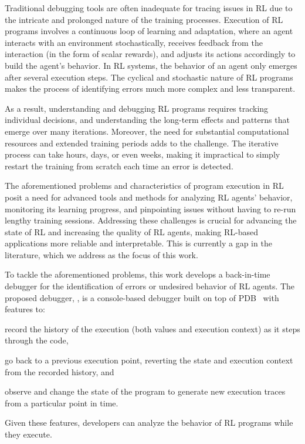 Traditional debugging tools are often inadequate for tracing issues in \ac{RL} due to the intricate 
and prolonged nature of the training processes. Execution of \ac{RL} programs involves a 
continuous loop of learning and adaptation, where an agent 
interacts with an environment stochastically, receives feedback from the interaction (in the form of 
scalar rewards), and adjusts its actions accordingly to build the agent's behavior. In \ac{RL} systems, 
the behavior of an agent only emerges after several execution steps. The cyclical and stochastic 
nature of \ac{RL} programs makes the process of identifying errors much more complex and less 
transparent.

As a result, understanding and debugging \ac{RL} programs requires tracking individual 
decisions, and understanding the long-term effects and patterns that emerge over many iterations.
Moreover, the need for substantial computational resources and extended training 
periods adds to the challenge. The iterative process can take hours, days, or 
even weeks, making it impractical to simply restart the training from scratch 
each time an error is detected.

The aforementioned problems and characteristics of program execution in \ac{RL} posit a need 
for advanced tools and methods for analyzing \ac{RL} agents' behavior, monitoring its learning 
progress, and pinpointing issues without having to re-run lengthy training sessions.
Addressing these challenges is crucial for advancing the state of \ac{RL} and increasing the quality 
of \ac{RL} agents, making \ac{RL}-based applications more reliable and interpretable. This is 
currently a gap in the literature, which we address as the focus of this work.

To tackle the aforementioned problems, this work develops a back-in-time 
debugger for the identification of errors or undesired behavior of \ac{RL} agents. The proposed 
debugger, \flik, is a console-based debugger built on top of PDB~\cite{python-pdb} with features to: 
\begin{enumerate*}[label=(\arabic*)]
\item record the history of the execution (both values and execution context) as it steps through the 
code,
\item go back to a previous execution point, reverting the state and execution context from the 
recorded history, and 
\item observe and change the state of the program to generate new execution traces from a particular 
point in time.
\end{enumerate*}
Given these features, developers can analyze the behavior of \ac{RL} programs while they execute. 

